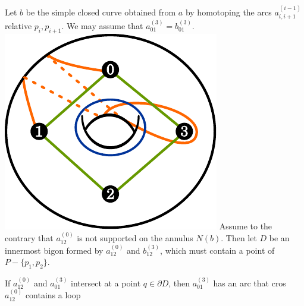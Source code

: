 \documentclass[11pt]{article}
\theoremstyle{remark}
\theoremstyle{definition}
\begin{document}
Let $b$ be the simple closed curve obtained from $a$
by homotoping the arcs $a^{(i-1)}_{i,i+1}$ relative ${p_i,p_{i+1}}$.
We may assume that $a^{(3)}_{01}=b^{(3)}_{01}$.
\includegraphics[width=.5\textwidth]{figures/stayinannulus.pdf}
Assume to the contrary that
$a^(0)_{12}$
is not supported on the annulus $N(b)$.
Then let $D$ be an innermost bigon formed by $a^{(0)}_{12}$ and
$b^{(3)}_{12}$, which must contain
a point of $P-\{p_1,p_2\}$.

If
$a^{(0)}_{12}$ and
$a^{(3)}_{01}$ intersect at a point $q \in \partial D$,
then $a^{(3)}_{01}$ has an arc that cros
 $a^{(0)}_{12}$
contains a loop

\end{document}

